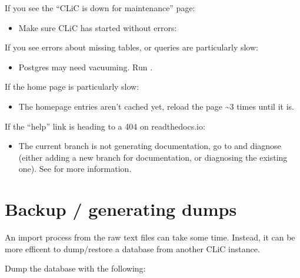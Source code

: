 \documentclass[letterpaper,10pt,english]{sphinxmanual}
\begin{document}
\sphinxAtStartPar
If you see the “CLiC is down for maintenance” page:
\begin{itemize}
\item {} 
\sphinxAtStartPar
Make sure CLiC has started without errors: 

\end{itemize}

\sphinxAtStartPar
If you see errors about missing tables, or queries are particularly slow:
\begin{itemize}
\item {} 
\sphinxAtStartPar
Postgres may need vacuuming. Run .

\end{itemize}

\sphinxAtStartPar
If the home page is particularly slow:
\begin{itemize}
\item {} 
\sphinxAtStartPar
The homepage entries aren’t cached yet, reload the page \textasciitilde{}3 times until it is.

\end{itemize}

\sphinxAtStartPar
If the “help” link is heading to a 404 on readthedocs.io:
\begin{itemize}
\item {} 
\sphinxAtStartPar
The current branch is not generating documentation, go to  and diagnose (either adding a new branch for documentation, or diagnosing the existing one). See {\hyperref[\detokenize{advanced/development::doc}]{}} for more information.

\end{itemize}


\section{Back\sphinxhyphen{}up / generating dumps}
\label{\detokenize{advanced/production:back-up-generating-dumps}}
\sphinxAtStartPar
An import process from the raw text files can take some time.
Instead, it can be more efficent to dump/restore a database from another CLiC
instance.

\sphinxAtStartPar
Dump the database with the following:
\end{document}
